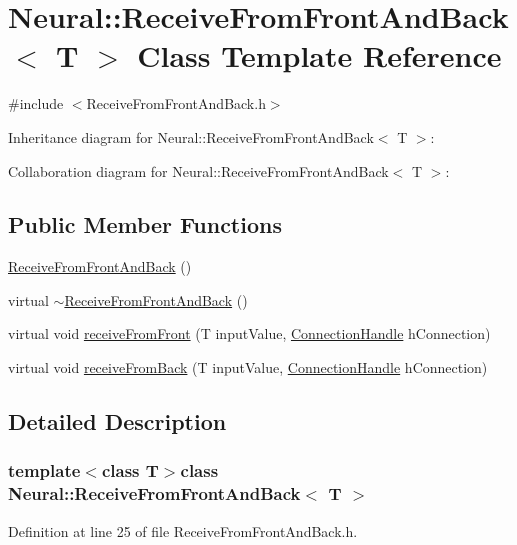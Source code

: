 \hypertarget{class_neural_1_1_receive_from_front_and_back}{
\section{Neural::ReceiveFromFrontAndBack$<$ T $>$ Class Template Reference}
\label{class_neural_1_1_receive_from_front_and_back}
}


{\ttfamily \#include $<$ReceiveFromFrontAndBack.h$>$}



Inheritance diagram for Neural::ReceiveFromFrontAndBack$<$ T $>$:


Collaboration diagram for Neural::ReceiveFromFrontAndBack$<$ T $>$:
\subsection*{Public Member Functions}
\begin{DoxyCompactItemize}
\item 
\hyperlink{class_neural_1_1_receive_from_front_and_back_ae93beda47c22c6fb3c4299193682b869}{ReceiveFromFrontAndBack} ()
\item 
virtual \hyperlink{class_neural_1_1_receive_from_front_and_back_a1a5a026f5d47eba43500763bceb28c05}{$\sim$ReceiveFromFrontAndBack} ()
\item 
virtual void \hyperlink{class_neural_1_1_receive_from_front_and_back_af483f1dfff9288b62c4324f973ca917b}{receiveFromFront} (T inputValue, \hyperlink{namespace_neural_a73b2763d14999ad4308dbf4246aa503f}{ConnectionHandle} hConnection)
\item 
virtual void \hyperlink{class_neural_1_1_receive_from_front_and_back_aedc1e9175278a87a6b5954b727669d4b}{receiveFromBack} (T inputValue, \hyperlink{namespace_neural_a73b2763d14999ad4308dbf4246aa503f}{ConnectionHandle} hConnection)
\end{DoxyCompactItemize}


\subsection{Detailed Description}
\subsubsection*{template$<$class T$>$class Neural::ReceiveFromFrontAndBack$<$ T $>$}



Definition at line 25 of file ReceiveFromFrontAndBack.h.



